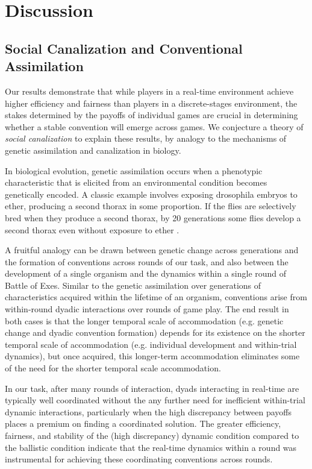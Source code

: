 \documentclass[10pt,letterpaper]{article}
\begin{document}
\section*{Discussion}

\subsection*{Social Canalization and Conventional Assimilation}

Our results demonstrate that while players in a real-time environment achieve higher efficiency and fairness than players in a discrete-stages environment, the stakes determined by the payoffs of individual games are crucial in determining whether a stable convention will emerge across games. We conjecture a theory of \emph{social canalization} to explain these results, by analogy to the mechanisms of genetic assimilation and canalization in biology. 

In biological evolution, genetic assimilation occurs when a phenotypic characteristic that is elicited from an environmental condition becomes genetically encoded.  A classic example involves exposing drosophila embryos to ether, producing a second thorax in some proportion.  If the flies are selectively bred when they produce a second thorax, by 20 generations some flies develop a second thorax even without exposure to ether \cite{Waddington56_BithoraxPhenotype}. 

A fruitful analogy can be drawn between genetic change across generations and the formation of conventions across rounds of  our task, and also between the development of a single organism and the dynamics within a single round of Battle of Exes.  Similar to the genetic assimilation over generations of characteristics acquired within the lifetime of an organism, conventions arise from within-round dyadic interactions over rounds of game play.  The end result in both cases is that the longer temporal scale of accommodation (e.g. genetic change and dyadic convention formation) depends for its existence on the shorter temporal scale of accommodation (e.g. individual development and within-trial dynamics), but once acquired, this longer-term accommodation eliminates some of the need for the shorter temporal scale accommodation.  

In our task, after many rounds of interaction,  dyads interacting in real-time are typically well coordinated without the any further need for inefficient within-trial dynamic interactions, particularly when the high discrepancy between payoffs places a premium on finding a coordinated solution. The greater efficiency, fairness, and stability of the (high discrepancy) dynamic condition compared to the ballistic condition indicate that the real-time dynamics within a round was instrumental for achieving these coordinating conventions across rounds.
\end{document}
